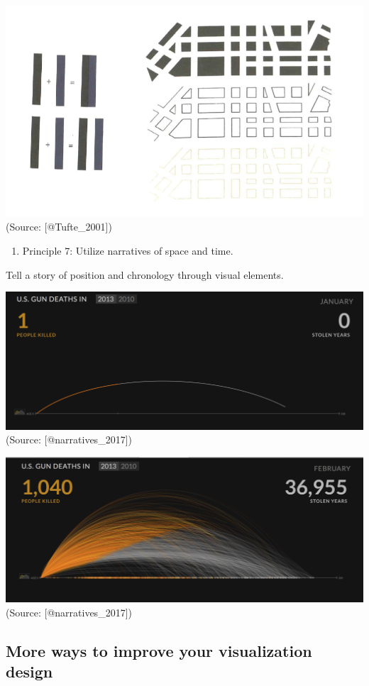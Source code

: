 \documentclass[]{book}
\providecommand{\tightlist}{%
  \setlength{\itemsep}{0pt}\setlength{\parskip}{0pt}}
\theoremstyle{definition}
\theoremstyle{definition}
\theoremstyle{definition}
\theoremstyle{remark}
\begin{document}
\includegraphics{images/Tufte_figure10.png} (Source: {[}@Tufte\_2001{]})

\begin{enumerate}
\def\labelenumi{\arabic{enumi}.}
\setcounter{enumi}{6}
\tightlist
\item
  Principle 7: Utilize narratives of space and time.
\end{enumerate}

Tell a story of position and chronology through visual elements.

\includegraphics{images/Tufte_figure11.png} (Source:
{[}@narratives\_2017{]})

\includegraphics{images/Tufte_figure12.png} (Source:
{[}@narratives\_2017{]})

\subsection{More ways to improve your visualization
design}\label{more-ways-to-improve-your-visualization-design}
\end{document}
